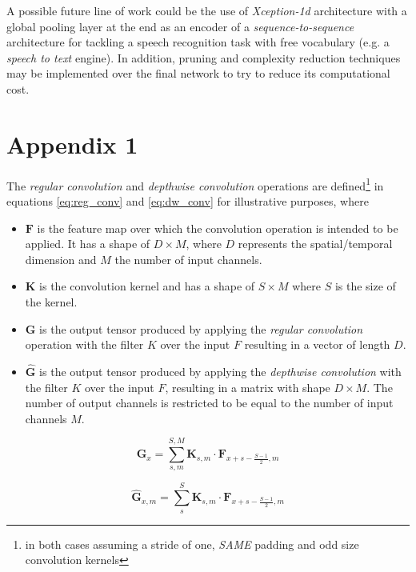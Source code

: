 A possible future line of work could be  the use of \textit{Xception-1d} architecture with a global pooling layer at the end  as an encoder of a \textit{sequence-to-sequence} architecture for tackling a speech recognition task with free vocabulary (e.g. a \textit{speech to text} engine). In addition, pruning and complexity reduction techniques may be implemented over the final network to try to reduce its computational cost.


\section*{Appendix 1}
The \textit{regular convolution} and \textit{depthwise convolution} operations \cite{howard2017}  are defined\footnote{in both cases assuming a stride of one, \textit{SAME} padding and odd size convolution kernels} in equations \ref{eq:reg_conv} and  \ref{eq:dw_conv} for illustrative purposes, where

\begin{itemize}
	\item $\mathbf{F}$ is the feature map over which the convolution operation is intended to be applied. It has a shape of $D \times M$, where $D$ represents the spatial/temporal dimension and $M$ the number of input channels.
	\item $\mathbf{K}$ is the convolution kernel and has a shape of $S \times M$ where $S$ is the size of the kernel.
	\item $\mathbf{G}$ is the output tensor produced by applying the \textit{regular convolution} operation with the filter $K$ over the input $F$ resulting in a vector of length $D$.
	\item $\hat{\mathbf{G}}$ is the output tensor produced by applying the \textit{depthwise convolution} with the filter $K$ over the input $F$, resulting in a matrix with shape $D \times M$. The number of output channels is restricted to be equal to the number of input channels $M$.
\end{itemize}


\begin{equation}
\mathbf{G}_{x} = \sum_{s, m}^{S,M} \mathbf{K}_{s, m} \cdot \mathbf{F}_{x+s-\frac{S-1}{2}, m}
\label{eq:reg_conv}
\end{equation}

\begin{equation}
\hat{\mathbf{G}}_{x, m} = \sum_{s}^{S} \mathbf{K}_{s, m} \cdot \mathbf{F}_{x+s-\frac{S-1}{2}, m}
\label{eq:dw_conv}
\end{equation}

